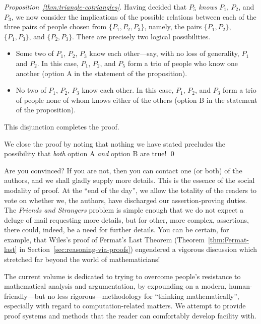\begin{proof}[Proposition~\ref{thm:triangle-cotriangles}]
\bigskip

\noindent
Having decided that $P_5$ {\em knows} $P_1$, $P_2$, and $P_3$, we now consider the implications of the possible relations between each of the three pairs of people chosen from $\{P_1, P_2, P_3\}$, namely, the pairs  $\{P_1, P_2\}$, $\{P_1, P_3\}$, and $\{P_2, P_3\}$.  There
are precisely two logical possibilities.
\begin{itemize}
\item
Some two of $P_1$, $P_2$, $P_3$ know each other---say, with no loss of generality, $P_1$ and $P_2$.  In this case, $P_1$, $P_2$, and $P_5$ form a trio of people who know one another (option A in the statement of the proposition).
\item
No two of $P_1$, $P_2$, $P_3$ know each other.  In this case, $P_1$, $P_2$, and $P_3$ form a trio of people none of whom knows either of the others (option B in the statement of the proposition).
\end{itemize}
This disjunction completes the proof.

We close the proof by noting that nothing we have stated precludes the possibility that {\em both} option A {\em and} option B are true!  \qed
\end{proof}

Are you convinced?  If you are not, then you can contact one (or both) of the authors, and we shall gladly supply more details.  This is the essence of the social modality of proof.  At the ``end of the day'', we allow the totality of the readers to vote on whether we, the authors, have discharged our assertion-proving duties.  The {\it Friends and Strangers} problem is simple enough that we do not expect a deluge of mail requesting more details, but for other, more complex, assertions, there could, indeed, be a need for further details.  You can be certain, for example, that Wiles's proof of Fermat's Last Theorem (Theorem~\ref{thm:Fermat-last} in Section~\ref{sec:reasoning-via-proofs}) engendered a vigorous discussion which stretched far beyond the world of mathematicians!

\bigskip

The current volume is dedicated to trying to overcome people's resistance to mathematical analysis and argumentation, by expounding on a modern, human-friendly---but no less rigorous---methodology for ``thinking mathematically'', especially with regard to computation-related matters.  We attempt to provide proof systems and methods that the reader can
comfortably develop facility with.

